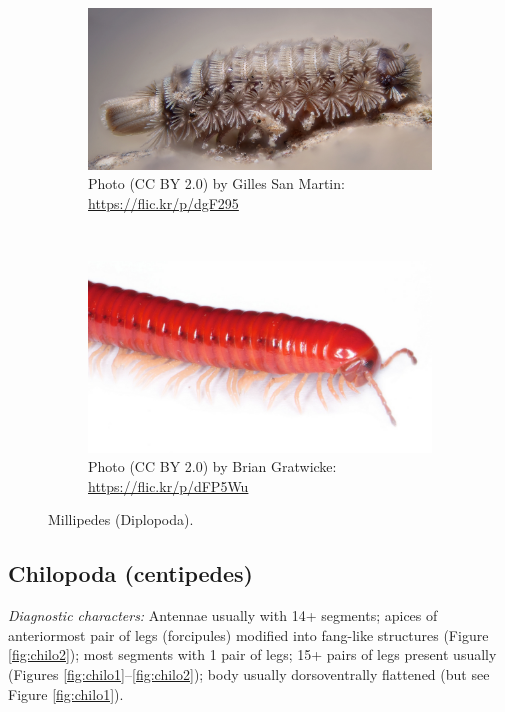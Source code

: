 \documentclass[letterpaper, 11pt]{article}
\begin{document}
\begin{figure}[ht!]
    \centering
    \begin{subfigure}[ht!]{0.35\textwidth}
        \includegraphics[width=\textwidth]{diplop1}
        \caption{Photo (CC BY 2.0) by Gilles San Martin: \url{https://flic.kr/p/dgF295}}
        \label{fig:diplop1}
    \end{subfigure}
    ~ %
    \begin{subfigure}[ht!]{0.55\textwidth}
        \includegraphics[width=\textwidth]{diplop2}
        \caption{Photo (CC BY 2.0) by Brian Gratwicke: \url{https://flic.kr/p/dFP5Wu}}
        \label{fig:diplop2}
    \end{subfigure}
    \caption{Millipedes (Diplopoda).} \label{fig:diplopoda}
\end{figure}

\subsection{Chilopoda (centipedes)}
\noindent{}\textit{Diagnostic characters:} Antennae usually with 14+ segments; apices of anteriormost pair of legs (forcipules) modified into fang-like structures (Figure \ref{fig:chilo2}); most segments with 1 pair of legs; 15+ pairs of legs present usually (Figures \ref{fig:chilo1}--\ref{fig:chilo2}); body usually dorsoventrally flattened (but see Figure \ref{fig:chilo1}).\\
\end{document}
